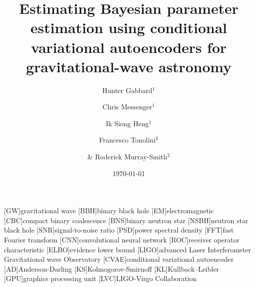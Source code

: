 \documentclass[%
showpacs,
 amsmath,amssymb,
 aps,
 twocolumn,
 prl,
 reprint,
floatfix,
]{revtex4-1}
\begin{document}

\title{Estimating Bayesian parameter estimation using conditional variational
autoencoders for gravitational-wave astronomy}

\author{Hunter Gabbard$^1$}
\author{Chris Messenger$^1$}
\author{Ik Siong Heng$^1$}
\author{Francesco Tonolini$^2$}
\author{\& Roderick Murray-Smith$^2$}


\date{\today}

\maketitle

[GW]{gravitational wave}
[BBH]{binary black hole}
[EM]{electromagnetic}
[CBC]{compact binary coalescence}
[BNS]{binary neutron star}
[NSBH]{neutron star black hole}
[SNR]{signal-to-noise ratio}
[PSD]{power spectral density}
[FFT]{fast Fourier transform}
[CNN]{convolutional neural network}
[ROC]{receiver operator characteristic}
[ELBO]{evidence lower bound}
[LIGO]{advanced Laser Interferometer Gravitational wave Observatory}
[CVAE]{conditional variational autoencoder}
[AD]{Anderson-Darling}
[KS]{Kolmogorov-Smirnoff}
[KL]{Kullback–Leibler}
[GPU]{graphics processing unit}
[LVC]{LIGO-Virgo Collaboration}
\end{document}
